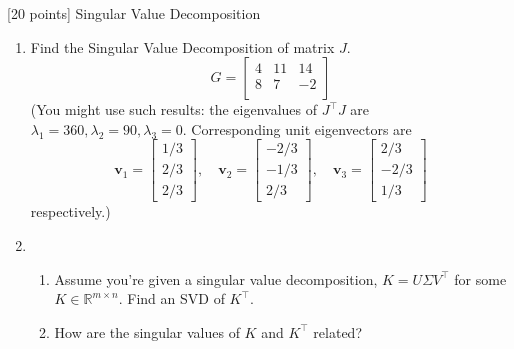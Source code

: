 [20 points] Singular Value Decomposition\\

\vspace{0.1in}

\begin{enumerate}
    \item Find the Singular Value Decomposition of matrix $J$.
    \[G = \begin{bmatrix}
    4 & 11 & 14\\
    8 & 7 & -2\\
    \end{bmatrix}\]
    (You might use such results: the eigenvalues of $J^\top J$ are $\lambda_1=360,\lambda_2=90,\lambda_3=0$. Corresponding unit eigenvectors are
    $$
    \left.\mathbf{v}_{1}=\left[\begin{array}{r}1/3\\2/3\\2/3\end{array}\right.\right],\quad\mathbf{v}_{2}=\left[\begin{array}{r}-2/3\\-1/3\\2/3\end{array}\right],\quad\mathbf{v}_{3}=\left[\begin{array}{r}2/3\\-2/3\\1/3\end{array}\right]
    $$
    respectively.)
    \item 
    \begin{enumerate}
        \item Assume you're given a singular value decomposition, $K=U\Sigma V^\top$ for some $K \in \mathbb{R}^{m\times n}$. Find an SVD of $K^\top$. 
        \item How are the singular values of $K$ and $K^\top$ related?
    \end{enumerate}
\end{enumerate}